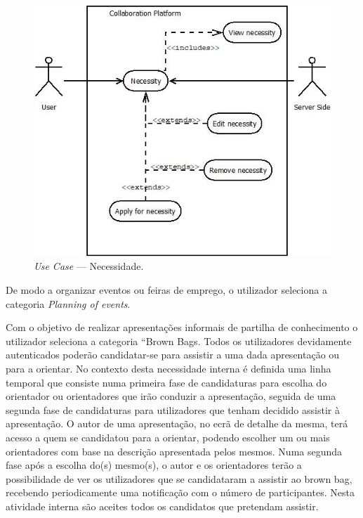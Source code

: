 \begin{figure}[H]
    \centering
    \includegraphics[scale=0.8]{figures/Necessity.jpeg}
    \caption{\textit{Use Case} --- Necessidade.}\label{fig:uc:necessity}
\end{figure}

De modo a organizar eventos ou feiras de emprego, o utilizador seleciona a categoria \textit{Planning of events}.

Com o objetivo de realizar apresentações informais de partilha de conhecimento o utilizador seleciona a categoria “Brown Bags. 
Todos os utilizadores devidamente autenticados poderão candidatar-se para assistir a uma dada apresentação ou para a orientar. 
No contexto desta necessidade interna é definida uma linha temporal que consiste numa primeira fase de candidaturas para escolha do orientador 
ou orientadores que irão conduzir a apresentação, seguida de uma segunda fase de candidaturas para utilizadores que tenham decidido assistir à apresentação. 
O autor de uma apresentação, no ecrã de detalhe da mesma, terá acesso a quem se candidatou para a orientar, podendo escolher um ou mais orientadores 
com base na descrição apresentada pelos mesmos. 
Numa segunda fase após a escolha do(s) mesmo(s), o autor e os orientadores terão a possibilidade de ver os utilizadores que se 
candidataram a assistir ao brown bag, recebendo periodicamente uma notificação com o número de participantes. 
Nesta atividade interna são aceites todos os candidatos que pretendam assistir.

